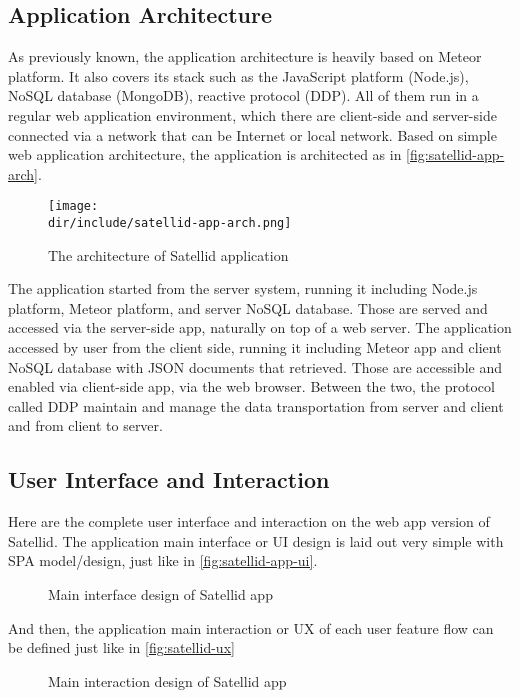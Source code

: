 \subsection{Application Architecture}

As previously known, the application architecture is heavily based on Meteor platform.
It also covers its stack such as the JavaScript platform (Node.js), NoSQL database (MongoDB), reactive protocol (DDP).
All of them run in a regular web application environment, which there are client-side and server-side connected via a network that can be Internet or local network.
Based on simple web application architecture, the application is architected as in \autoref{fig:satellid-app-arch}.

\begin{figure}[htbp]
    \centering
    \texttt{[image: \\dir/include/satellid-app-arch.png]}
    \caption[Satellid Application Architecture]{The architecture of Satellid application}
    \label{fig:satellid-app-arch}
\end{figure}

The application started from the server system, running it including Node.js platform, Meteor platform, and server NoSQL database.
Those are served and accessed via the server-side app, naturally on top of a web server.
The application accessed by user from the client side, running it including Meteor app and client NoSQL database with \ac{JSON} documents that retrieved.
Those are accessible and enabled via client-side app, via the web browser.
Between the two, the protocol called \ac{DDP} maintain and manage the data transportation from server and client and from client to server.

\subsection{User Interface and Interaction}

Here are the complete user interface and interaction on the web app version of Satellid.
The application main interface or \ac{UI} design is laid out very simple with \ac{SPA} model/design, just like in \autoref{fig:satellid-app-ui}.

\begin{figure}[htb]
    \centering
    \caption{Main interface design of Satellid app}
    \label{fig:satellid-app-ui}
\end{figure}

And then, the application main interaction or \ac{UX} of each user feature flow can be defined just like in \autoref{fig:satellid-ux}

\begin{figure}[htb]
    \centering
    \caption{Main interaction design of Satellid app}
    \label{fig:satellid-app-ux}
\end{figure}

